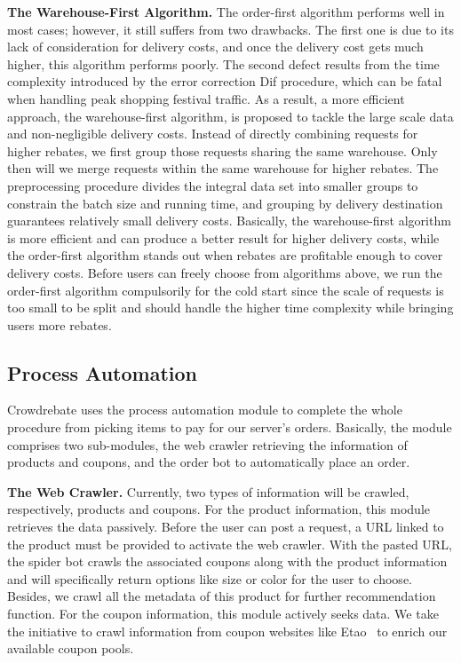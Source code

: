 \textbf{The Warehouse-First Algorithm.} The order-first algorithm performs well in most cases; however, it still suffers from two drawbacks. The first one is due to its lack of consideration for delivery costs, and once the delivery cost gets much higher, this algorithm performs poorly. The second defect results from the time complexity introduced by the error correction Dif procedure, which can be fatal when handling peak shopping festival traffic. As a result, a more efficient approach, the warehouse-first algorithm, is proposed to tackle the large scale data and non-negligible delivery costs. Instead of directly combining requests for higher rebates, we first group those requests sharing the same warehouse. Only then will we merge requests within the same warehouse for higher rebates. The preprocessing procedure divides the integral data set into smaller groups to constrain the batch size and running time, and grouping by delivery destination guarantees relatively small delivery costs. Basically, the warehouse-first algorithm is more efficient and can produce a better result for higher delivery costs, while the order-first algorithm stands out when rebates are profitable enough to cover delivery costs. Before users can freely choose from algorithms above, we run the order-first algorithm compulsorily for the cold start since the scale of requests is too small to be split and should handle the higher time complexity while bringing users more rebates.

\subsection{Process Automation}

Crowdrebate uses the process automation module to complete the whole procedure from picking items to pay for our server's orders. Basically, the module comprises two sub-modules, the web crawler retrieving the information of products and coupons, and the order bot to automatically place an order. 

\textbf{The Web Crawler.} Currently, two types of information will be crawled, respectively, products and coupons. For the product information, this module retrieves the data passively. Before the user can post a request, a URL linked to the product must be provided to activate the web crawler. With the pasted URL, the spider bot crawls the associated coupons along with the product information and will specifically return options like size or color for the user to choose. Besides, we crawl all the metadata of this product for further recommendation function. For the coupon information, this module actively seeks data. We take the initiative to crawl information from coupon websites like Etao~\cite{etao} to enrich our available coupon pools. 

